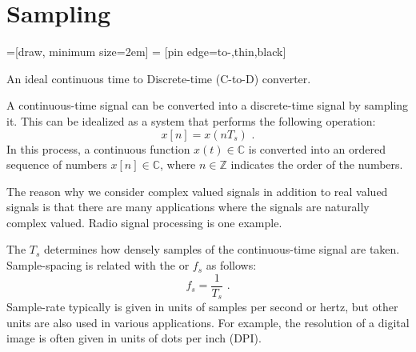 \section{Sampling}
\begin{marginfigure}
=[draw, minimum size=2em]
 = [pin edge={to-,thin,black}]
\begin{center}
\end{center}
\caption{An ideal continuous time to Discrete-time (C-to-D) converter.}
\end{marginfigure}


A continuous-time signal can be converted into a discrete-time signal
by sampling it. This can be idealized as a system that performs the following operation:
\begin{equation}
  \boxed{
    x[n] = x(n T_s)
    }\,\,.
\end{equation}
In this process, a continuous function $x(t) \in \mathbb{C}$ is converted into an ordered sequence of numbers $x[n] \in \mathbb{C}$, where $n\in\mathbb{Z}$ indicates the order of the numbers.

The reason why we consider complex valued signals in addition to real valued signals is that there are many applications where the signals are naturally complex valued. Radio signal processing is one example. 

The  $T_s$ determines how densely samples of the continuous-time signal are taken. Sample-spacing is related with the  or  $f_s$ as follows:
\begin{equation}
  \boxed{
    f_s = \frac{1}{T_s}
    }\,\,.
\end{equation}
Sample-rate typically is given in units of samples per second or hertz, but other units are also used in various applications. For example, the resolution of a digital image is often given in units of dots per inch (DPI).


